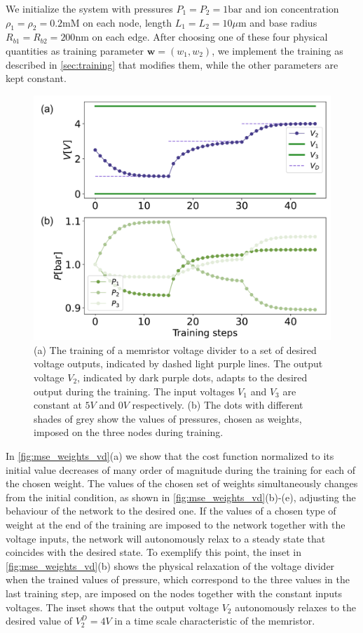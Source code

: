 \documentclass[reprint,superscriptaddress,prb,showkeys]{revtex4-2}
\newcommand{\brac}[1]{\left(#1 \right)} %
\begin{document}
We initialize the system with pressures $P_1 =  P_2 = 1 \text{bar}$ and ion concentration $\rho_1 = \rho_2 = 0.2 \text{mM}$ on each node, length $L_1 = L_2 = 10\mu \text{m}$ and base radius  $R_{b1} = R_{b2} = 200 \text{nm}$ on each edge. After choosing one of these four physical quantities as training parameter $\boldsymbol{w} = \brac{w_1, w_2}$, we implement the training as described in \cref{sec:training} that modifies them, while the other parameters are kept constant. 
\begin{figure}[b]
    \centering
    \includegraphics[width=0.8\columnwidth]{plots/voltage_divider/evolution_targets.pdf}
    \caption{(a) The training of a memristor voltage divider to a set of desired voltage outputs, indicated by dashed light purple lines. The output voltage $V_2$, indicated by dark purple dots, adapts to the desired output during the training. The input voltages $V_1$ and $V_3$ are constant at $5V$ and $0V$ respectively. (b) The dots with different shades of grey show the values of pressures, chosen as weights, imposed on the three nodes during training.}\label{fig:evolution_targets}
\end{figure}
In \cref{fig:mse_weights_vd}(a) we show that the cost function normalized to its initial value decreases of many order of magnitude during the training for each of the chosen weight. The values of the chosen set of weights simultaneously changes from the initial condition, as shown in \cref{fig:mse_weights_vd}(b)-(e), adjusting the behaviour of the network to the desired one. If the values of a chosen type of weight at the end of the training are imposed to the network together with the voltage inputs, the network will autonomously relax to a steady state that coincides with the desired state. To exemplify this point, the inset in \cref{fig:mse_weights_vd}(b) shows the physical relaxation of the voltage divider when the trained values of pressure, which correspond to the three values in the last training step, are imposed on the nodes together with the constant inputs voltages. The inset shows that the output voltage $V_2$ autonomously relaxes to the desired value of $V_2^D=4V$ in a time scale characteristic of the memristor.
\end{document}
